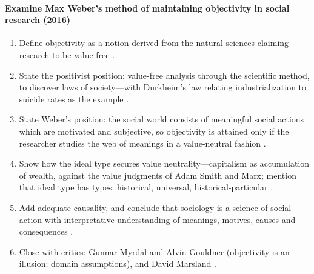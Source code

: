 \paragraph{Examine Max Weber's method of maintaining objectivity in social research (2016)}
\begin{enumerate}
    \item Define objectivity as a notion derived from the natural sciences claiming research to be value free .
    \item State the positivist position: value-free analysis through the scientific method, to discover laws of society---with Durkheim's law relating industrialization to suicide rates as the example .
    \item State Weber's position: the social world consists of meaningful social actions which are motivated and subjective, so objectivity is attained only if the researcher studies the web of meanings in a value-neutral fashion .
    \item Show how the ideal type secures value neutrality---capitalism as accumulation of wealth, against the value judgments of Adam Smith and Marx; mention that ideal type has types: historical, universal, historical-particular .
    \item Add adequate causality, and conclude that sociology is a science of social action with interpretative understanding of meanings, motives, causes and consequences .
    \item Close with critics: Gunnar Myrdal and Alvin Gouldner (objectivity is an illusion; domain assumptions), and David Marsland .
\end{enumerate}

